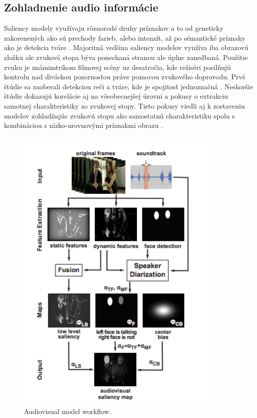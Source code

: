 \subsection{Zohladnenie audio informácie}
Saliency modely využívaju rôznorodé druhy príznakov a to od geneticky zakorenených ako sú prechody farieb, alebo intenzít, až po sémantické príznaky ako je detekcia tváre \cite{salient-faces}.
Majoritná vedšina saliency modelov využíva iba obrazovú zložku ale zvuková stopa býva ponechaná stranou ale úplne zanedbaná.
Použitie zvuku je známimtrikom filmovej scény uz desatročia, kde režiséri posilňujú kontrolu nad diváckou pozornosťou práve pomocou zvukového doprovodu.
Prvé štúdie sa zaoberali detekciou reči a tváre, kde je spojitosť jednoznačná \cite{sound-1}.
Neskoršie štúdie dokazujú korelácie aj na všeobecnejšej úrovni a pokusy o extrakciu samotnej charakteristiky zo zvukovej stopy\cite{sound-coutrot-1}.
Tieto pokusy viedli aj k zostaveniu modelov zohladňujúc zvukovú stopu ako samostatnú charakteristiku spolu s kombináciou s nízko-urovnovými príznakmi obrazu \cite{sound-courot-2}.

\begin{figure}[H]
  \centering
  \includegraphics[width=10cm]{pics/courot-1.png}
  \caption{Audiovisual model workflow.\cite{sound-courot-2}}\label{wrap-fig:4}
\end{figure}
\vspace{10mm}

